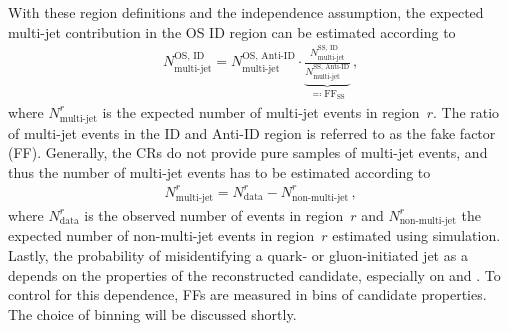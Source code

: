 With these region definitions and the independence assumption, the expected
multi-jet contribution in the OS ID region can be estimated according to
\begin{align*}
  N_\text{multi-jet}^{\text{OS, ID}} =
  N_\text{multi-jet}^{\text{OS, Anti-ID}}
  \cdot
  \underbrace{\frac{N_\text{multi-jet}^{\text{SS, ID}}}
  {N_\text{multi-jet}^{\text{SS, Anti-ID}}}}
  _{\eqqcolon \text{FF}_{\text{SS}}} \,\text{,}
\end{align*}
where $N_\text{multi-jet}^{r}$ is the expected number of multi-jet events in
region~$r$. The ratio of multi-jet events in the ID and Anti-ID region is
referred to as the fake factor (FF).
Generally, the CRs do not provide pure samples of multi-jet events, and thus the
number of multi-jet events has to be estimated according to
\begin{align*}
  N_\text{multi-jet}^{r} = N_\text{data}^{r} - N_\text{non-multi-jet}^{r} \,\text{,}
\end{align*}
where $N_\text{data}^{r}$ is the observed number of events in region~$r$ and
$N_\text{non-multi-jet}^{r}$ the expected number of non-multi-jet events in
region~$r$ estimated using simulation. Lastly, the probability of misidentifying
a quark- or gluon-initiated jet as a \tauhadvis depends on the properties of the
reconstructed \tauhadvis candidate, especially on \Ntracks and \pT. To control
for this dependence, FFs are measured in bins of \tauhadvis candidate
properties. The choice of binning will be discussed shortly.


